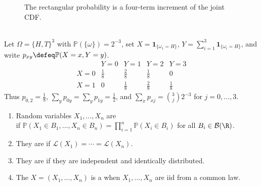 \begin{figure}[H]
  \centering
  
  \caption{The rectangular probability is a four-term increment of the joint CDF.}
  \label{fig:joint-cdf-rectangular-increment}
\end{figure}

\begin{example} \label{ex:three-toss-joint-mass-table} \\
Let $\Omega=\{H,T\}^3$ with $\mathbb{P}(\{\omega\})=2^{-3}$, set $X=\mathbf{1}_{\{\omega_1=H\}}$, $Y=\sum\limits_{i=1}^{3}\mathbf{1}_{\{\omega_i=H\}}$, and write $p_{xy}\defeq\mathbb{P}(X=x,Y=y)$.
\[
\begin{array}{c|cccc}
&Y=0&Y=1&Y=2&Y=3\\ \hline
X=0&\frac{1}{8}&\frac{2}{8}&\frac{1}{8}&0\\
X=1&0&\frac{1}{8}&\frac{2}{8}&\frac{1}{8}
\end{array}
\]
Thus $p_{0,2}=\frac{1}{8}$, $\sum\limits_y p_{0y}=\sum\limits_y p_{1y}=\frac{1}{2}$, and $\sum\limits_x p_{xj}=\binom{3}{j}2^{-3}$ for $j=0,\ldots,3$.
\end{example}

\begin{definition} \label{def:independent-random-variables-and-iid-samples} 
\begin{enumerate}[label=(\roman*)]
\setlength{\itemsep}{0pt}
\item Random variables $X_1,\ldots,X_n$ are \\
if $\mathbb{P}(X_1\in B_1,\ldots,X_n\in B_n)=\prod\limits_{i=1}^{n}\mathbb{P}(X_i\in B_i)$ for all $B_i\in\mathcal{B}(\R)$.
\item They are  if $\mathcal{L}(X_1)=\cdots=\mathcal{L}(X_n)$.
\item They are  if they are independent and identically distributed.
\item The  $X=(X_1,\ldots,X_n)$ is a  when $X_1,\ldots,X_n$ are iid from a common law.
\end{enumerate}
\end{definition}

